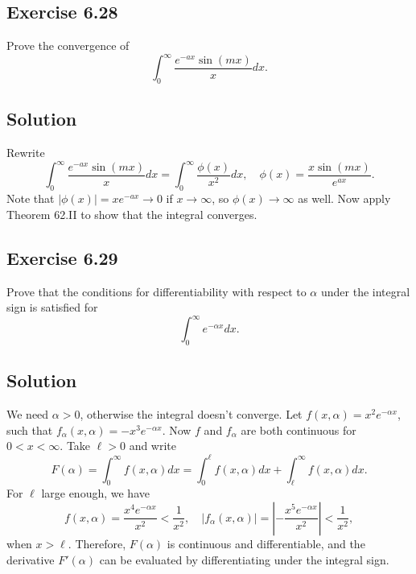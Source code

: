 \subsection*{Exercise 6.28}

Prove the convergence of
\begin{equation*}
    \int_0^{\infty} \frac{e^{-ax} \sin(mx)}{x} dx.
\end{equation*}

\subsection*{Solution}
Rewrite
\begin{equation*}
    \int_0^{\infty} \frac{e^{-ax} \sin(mx)}{x} dx
        = \int_0^{\infty} \frac{\phi(x)}{x^2} dx, \quad \phi(x) = \frac{x \sin(mx)}{e^{ax}}.
\end{equation*}
Note that $|\phi(x)| = xe^{-ax} \to 0$ if $x \to \infty$, so $\phi(x) \to \infty$ as well.
Now apply Theorem 62.II to show that the integral converges.


\subsection*{Exercise 6.29}

Prove that the conditions for differentiability with respect to $\alpha$ under the integral sign is satisfied for
\begin{equation*}
    \int_0^{\infty} e^{-\alpha x} dx.
\end{equation*}

\subsection*{Solution}

We need $\alpha > 0$, otherwise the integral doesn't converge.
Let $f(x, \alpha) = x^{2} e^{-\alpha x}$, such that $f_{\alpha}(x, \alpha) = -x^{3} e^{-\alpha x}$.
Now $f$ and $f_{\alpha}$ are both continuous for $0 < x < \infty$.
Take $\ell > 0$ and write
\begin{equation*}
    F(\alpha) = \int_0^{\infty} f(x, \alpha) dx = \int_0^{\ell} f(x, \alpha) dx + \int_{\ell}^{\infty} f(x, \alpha) dx.
\end{equation*}
For $\ell$ large enough, we have
\begin{equation*}
    f(x, \alpha) = \frac{x^4 e^{-\alpha x}}{x^2} < \frac{1}{x^2},
    \quad \left|f_{\alpha}(x, \alpha)\right| = \left|-\frac{x^5 e^{-\alpha x}}{x^2}\right| < \frac{1}{x^2},
\end{equation*}
when $x > \ell$.
Therefore, $F(\alpha)$ is continuous and differentiable, and the derivative $F'(\alpha)$ can be evaluated by differentiating under the integral sign.


